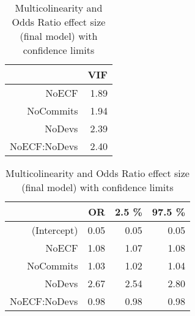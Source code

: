 \documentclass[times]{smrauth}
\begin{document}
\begin{table}[tbp]
\centering
\caption{Multicolinearity and Odds Ratio effect size (final model) with confidence limits} 
\label{tab:MulticolinearityFinal}
\begin{tabular}{rr}
  \hline
 & VIF \\ 
  \hline
NoECF & 1.89 \\ 
  NoCommits & 1.94 \\ 
  NoDevs & 2.39 \\ 
  NoECF:NoDevs & 2.40 \\ 
   \hline
\end{tabular}
\quad
\quad
\quad
\begin{tabular}{rrrr}
  \hline
 & OR & 2.5 \% & 97.5 \% \\ 
  \hline
(Intercept) & 0.05 & 0.05 & 0.05 \\ 
  NoECF & 1.08 & 1.07 & 1.08 \\ 
  NoCommits & 1.03 & 1.02 & 1.04 \\ 
  NoDevs & 2.67 & 2.54 & 2.80 \\ 
  NoECF:NoDevs & 0.98 & 0.98 & 0.98 \\ 
   \hline
\end{tabular}
\end{table}%
 





\end{document}
